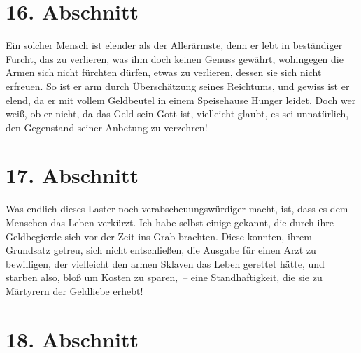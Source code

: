 \section{16. Abschnitt} \label{kap13_ab16}

Ein solcher Mensch ist elender als der Allerärmste,
denn er lebt in beständiger
Furcht, das zu verlieren, was ihm doch keinen Genuss gewährt, wohingegen die
Armen sich nicht fürchten dürfen, etwas zu verlieren, dessen sie sich nicht
erfreuen. So ist er arm durch Überschätzung seines Reichtums, und gewiss ist
er elend, da er mit vollem Geldbeutel in einem Speisehause Hunger leidet. Doch
wer weiß, ob er nicht, da das Geld sein Gott ist, vielleicht glaubt, es sei
unnatürlich, den Gegenstand seiner Anbetung zu verzehren!

\section{17. Abschnitt} \label{kap13_ab17}

 Was endlich dieses Laster noch
verabscheuungswürdiger macht, ist, dass es dem
Menschen das Leben verkürzt. Ich habe selbst einige gekannt, die durch ihre
Geldbegierde sich vor der Zeit ins Grab brachten. Diese konnten, ihrem
Grundsatz getreu, sich nicht entschließen, die Ausgabe für einen
Arzt zu
bewilligen, der vielleicht den armen Sklaven das Leben
gerettet hätte, und
starben also, bloß um Kosten zu sparen,~-- eine Standhaftigkeit, die sie zu
Märtyrern der Geldliebe erhebt!

\section{18. Abschnitt} \label{kap13_ab18}

